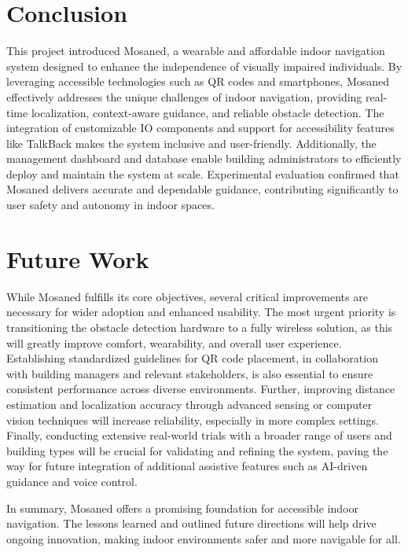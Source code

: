 \section{Conclusion}

This project introduced Mosaned, a wearable and affordable indoor navigation system designed to enhance the independence of visually impaired individuals. By leveraging accessible technologies such as QR codes and smartphones, Mosaned effectively addresses the unique challenges of indoor navigation, providing real-time localization, context-aware guidance, and reliable obstacle detection. The integration of customizable IO components and support for accessibility features like TalkBack makes the system inclusive and user-friendly. Additionally, the management dashboard and database enable building administrators to efficiently deploy and maintain the system at scale. Experimental evaluation confirmed that Mosaned delivers accurate and dependable guidance, contributing significantly to user safety and autonomy in indoor spaces.

\section{Future Work}

While Mosaned fulfills its core objectives, several critical improvements are necessary for wider adoption and enhanced usability. The most urgent priority is transitioning the obstacle detection hardware to a fully wireless solution, as this will greatly improve comfort, wearability, and overall user experience. Establishing standardized guidelines for QR code placement, in collaboration with building managers and relevant stakeholders, is also essential to ensure consistent performance across diverse environments. Further, improving distance estimation and localization accuracy through advanced sensing or computer vision techniques will increase reliability, especially in more complex settings. Finally, conducting extensive real-world trials with a broader range of users and building types will be crucial for validating and refining the system, paving the way for future integration of additional assistive features such as AI-driven guidance and voice control.

\bigskip

In summary, Mosaned offers a promising foundation for accessible indoor navigation. The lessons learned and outlined future directions will help drive ongoing innovation, making indoor environments safer and more navigable for all.
